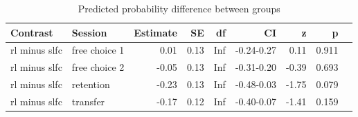 \documentclass[pdflatex,sn-nature]{sn-jnl}%
\theoremstyle{thmstyleone}%
\theoremstyle{thmstyletwo}%
\theoremstyle{thmstylethree}%
\begin{document}
\begin{appendices}
\begin{table}[ht]
\caption{Predicted probability difference between groups}\label{strategychoice_theorybest_groupdiff}
\begin{tabular}{llrrrrrrl}
  \hline
 Contrast & Session & Estimate & SE & df & CI & z & p \\ 
  \hline
rl minus slfc & free choice 1 & 0.01 & 0.13 & Inf & -0.24-0.27 & 0.11 &  0.911 \\ 
rl minus slfc & free choice 2 & -0.05 & 0.13 & Inf & -0.31-0.20 & -0.39 &   0.693 \\ 
rl minus slfc & retention & -0.23 & 0.13 & Inf & -0.48-0.03 & -1.75 &  0.079 \\ 
rl minus slfc & transfer & -0.17 & 0.12 & Inf & -0.40-0.07 & -1.41 &  0.159 \\ 
   \hline
\end{tabular}
\end{table}





\end{appendices}
\end{document}
